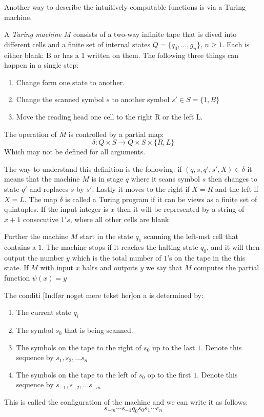 \documentclass[../main.tex]{subfiles}
\begin{document}
Another way to describe the intuitively computable functions is via a Turing
machine. 
\begin{defi}
	A \textit{Turing machine} $M$ consists of a two-way infinite tape that
	is dived into different cells and a finite set of internal states $Q=\{
	q_0,\ldots, g_n\}$, $n\geq 1$. Each is either blank: B or has a 1
	written on them. The following three things can happen in a single
	step:
	\begin{enumerate}
		\item Change form one state to another.
		\item Change the scanned symbol $s$ to another symbol
			$s'\in S=\{1,B\}$
		\item Move the reading head one cell to the right R or the left
			L.
	\end{enumerate}
	The operation of $M$ is controlled by a partial map:
	$$\delta:Q\times S\rightarrow Q\times S\times\{R,L\}$$
	Which may not be defined for all arguments.
\end{defi}
The way to understand this definition is the following: if
$(q,s,q',s',X)\in\delta$ it means that the machine $M$ is in stage $q$ where it
scans symbol $s$ then changes to state $q'$ and replaces $s$ by $s'$. Lastly it
moves to the right if $X=R$ and the left if $X=L$. The map $\delta$ is called a
Turing program if it can be views as a finite set of quintuples. If the input
integer is $x$ then it will be represented by a string of $x+1$ consecutive
$1's$, where all other cells are blank.

Further the machine $M$ start in the state $q_1$ scanning the left-mst cell
that contains a $1$. The machine stops if it reaches the halting state $q_0$,
and it will then output the number $y$ which is the total number of $1$'s on
the tape in the this state. If $M$ with input $x$ halts and outputs $y$ we
say that $M$ computes the partial function $\psi(x)=y$

The conditi [Indfør noget mere tekst her]on a is determined by:
\begin{enumerate}
	\item The current state $q_i$
	\item The symbol $s_0$ that is being scanned.
	\item The symbols on the tape to the right of $s_0$ up to the last $1$.
		Denote this sequence by $s_1,s_2,\ldots s_n$
	\item The symbols on the tape to the left of $s_0$ op to the first $1$.
		Denote this sequence by $s_{-1},s_{-2},\ldots s_{-m}$
\end{enumerate}
This is called the configuration of the machine and we can write it as follows:
$$s_{-m}\cdots s_{-1}q_0s_0s_1\cdots c_n$$
\end{document}
